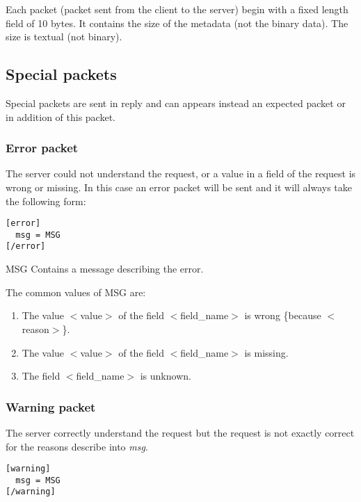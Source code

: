 Each packet (packet sent from the client to the server) begin with a fixed length field of 10 bytes. It contains the size of the metadata (not the binary data). The size is textual (not binary).

\subsection{Special packets}
\label{wire:specialpackets}

Special packets are sent in reply and can appears instead an expected packet or in addition of this packet.

\subsubsection{Error packet}
\label{wire:specialpackets:errorpacket}

 The server could not understand the request, or a value in a field of the request is wrong or missing.
In this case an error packet will be sent and it will always take the following form:
\begin{lstlisting}
[error]
  msg = MSG
[/error]
\end{lstlisting}

\begin{description}
 \item MSG Contains a message describing the error.
\end{description}

The common values of MSG are:

\begin{enumerate}
 \item The value $<$value$>$ of the field $<$field\_name$>$ is wrong \{because $<$reason$>$\}.
 \item The value $<$value$>$ of the field $<$field\_name$>$ is missing.
 \item The field $<$field\_name$>$ is unknown.
\end{enumerate}

\subsubsection{Warning packet}
\label{wire:specialpackets:warningpacket}

The server correctly understand the request but the request is not exactly correct for the reasons describe into \textit{msg}.
\begin{lstlisting}
[warning]
  msg = MSG
[/warning]
\end{lstlisting}

